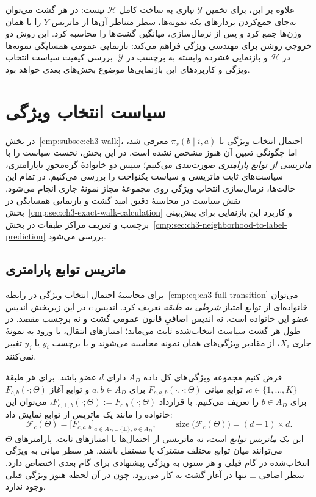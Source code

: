 علاوه بر این، برای تخمین $\mathscr Y$ نیازی به ساخت کامل $\mathscr H$ نیست: در هر گشت می‌توان به‌جای جمع‌کردن بردارهای یکه نمونه‌ها، سطر متناظر آن‌ها از ماتریس $Y$ را با همان وزن‌ها جمع کرد و پس از نرمال‌سازی، میانگین گشت‌ها را محاسبه کرد. این روش دو خروجی روشن برای مهندسی ویژگی فراهم می‌کند: بازنمایی عمومی همسایگی نمونه‌ها در $\mathscr H$ و بازنمایی فشرده وابسته به برچسب در $\mathscr Y$. بررسی کیفیت سیاست انتخاب ویژگی و کاربردهای این بازنمایی‌ها موضوع بخش‌های بعدی خواهد بود.

\section{سیاست انتخاب ویژگی}
\label{cmp:sec:ch3-feature-selection-policy}
در بخش~\ref{cmp:subsec:ch3-walk}، احتمال انتخاب ویژگی با
$\pi_s(b\mid i,a)$ معرفی شد، اما چگونگی تعیین آن هنوز مشخص نشده است.
در این بخش، نخست سیاست را با \emph{ماتریسی از توابع پارامتری}
صورت‌بندی می‌کنیم؛ سپس دو خانوادهٔ گره‌محورِ ناپارامتری،
سیاست‌های ثابت ماتریسی و سیاست یکنواخت را بررسی می‌کنیم.
در تمام این حالت‌ها، نرمال‌سازی انتخاب ویژگی روی مجموعهٔ مجاز نمونهٔ جاری انجام می‌شود.
نقش سیاست در محاسبهٔ دقیق امید گشت و بازنمایی همسایگی در
بخش~\ref{cmp:sec:ch3-exact-walk-calculation} و کاربرد این بازنمایی
برای پیش‌بینی برچسب و تعریف مراکز طبقات در
بخش~\ref{cmp:sec:ch3-neighborhood-to-label-prediction} بررسی می‌شود.

\subsection{ماتریس توابع پارامتری}
\label{cmp:subsec:ch3-parametric-feature-policy}
برای محاسبهٔ احتمال انتخاب ویژگی در رابطه~\eqref{cmp:eq:ch3-full-transition}
می‌توان خانواده‌ای از توابع امتیاز \emph{شرطی به طبقه}
تعریف کرد. اندیس $c$ در این زیر‌بخش اندیس عضو این
خانواده است، نه اندیس اضافیِ قانون عمومی گشت و نه
برچسب مقصد. در طول هر گشت سیاست انتخاب‌شده ثابت
می‌ماند؛ امتیازهای انتقال، با ورود به نمونهٔ جاری $X_i$،
از مقادیر ویژگی‌های همان نمونه محاسبه می‌شوند و با
برچسب $y_i$ یا $y_j$ تغییر نمی‌کنند.

فرض کنیم مجموعه ویژگی‌های کل داده $A_D$ دارای $d$ عضو باشد.
برای هر طبقهٔ $c\in\{1,\ldots,K\}$، توابع میانی $F_{c,a,b}(\cdot,\cdot;\Theta)$ برای
$a,b\in A_D$ و توابع آغاز $F_{c,b}(\cdot;\Theta)$ برای $b\in A_D$
را تعریف می‌کنیم. با قرارداد $F_{c,\bot,b}(\cdot;\Theta):=F_{c,b}(\cdot;\Theta)$،
می‌توان این خانواده را مانند یک ماتریس از توابع نمایش داد:
\begin{equation}\label{cmp:eq:ch3-parametric-score-matrix}
\boxed{
\mathcal F_{c}(\Theta)=
\bigl[F_{c,a,b}\bigr]_{a\in A_D\cup\{\bot\},\,b\in A_D},
\qquad
\operatorname{size}\bigl(\mathcal F_{c}(\Theta)\bigr)=(d+1)\times d.
}
\end{equation}
این یک \emph{ماتریس توابع} است، نه ماتریسی از احتمال‌ها یا امتیازهای
ثابت. پارامترهای $\Theta$ می‌توانند میان توابع مختلف مشترک یا مستقل باشند.
هر سطر میانی به ویژگی انتخاب‌شده در گام قبلی و هر ستون به ویژگی پیشنهادی
برای گام بعدی اختصاص دارد. سطر اضافی $\bot$ تنها در آغاز گشت به کار می‌رود،
چون در آن لحظه هنوز ویژگی قبلی وجود ندارد.

